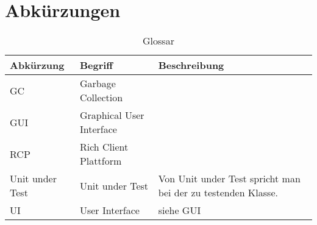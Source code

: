 \chapter*{Abkürzungen}\label{abkuerzungen}
  \begin{longtable}{|p{3cm}|p{5cm}|p{6cm}|}
      \caption{Glossar}\\
\hline
  \textbf{Abkürzung} &\textbf{Begriff} &  \textbf{Beschreibung} \\\hline
  GC & Garbage Collection & \\\hline
GUI & Graphical User Interface & \\\hline
RCP & Rich Client Plattform \\\hline
Unit under Test & Unit under Test & Von Unit under Test spricht man bei der zu testenden Klasse.\\\hline
UI & User Interface & siehe GUI \\\hline
  \end{longtable}



